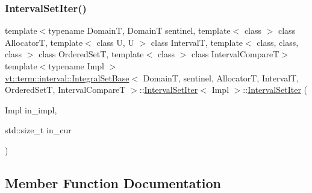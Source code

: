 \subsubsection{\texorpdfstring{Interval\+Set\+Iter()}{IntervalSetIter()}}
{\footnotesize\ttfamily template$<$typename DomainT, DomainT sentinel, template$<$ class $>$ class AllocatorT, template$<$ class U, U $>$ class IntervalT, template$<$ class, class, class $>$ class Ordered\+SetT, template$<$ class $>$ class Interval\+CompareT$>$ \\
template$<$typename Impl $>$ \\
\hyperlink{structvt_1_1term_1_1interval_1_1_integral_set_base}{vt\+::term\+::interval\+::\+Integral\+Set\+Base}$<$ DomainT, sentinel, AllocatorT, IntervalT, Ordered\+SetT, Interval\+CompareT $>$\+::\hyperlink{structvt_1_1term_1_1interval_1_1_integral_set_base_1_1_interval_set_iter}{Interval\+Set\+Iter}$<$ Impl $>$\+::\hyperlink{structvt_1_1term_1_1interval_1_1_integral_set_base_1_1_interval_set_iter}{Interval\+Set\+Iter} (\begin{DoxyParamCaption}\item[{Impl}]{in\+\_\+impl,  }\item[{std\+::size\+\_\+t}]{in\+\_\+cur }\end{DoxyParamCaption})\hspace{0.3cm}{\ttfamily [inline]}}



\subsection{Member Function Documentation}
\mbox{\label{structvt_1_1term_1_1interval_1_1_integral_set_base_1_1_interval_set_iter_ae229788677a1abe98372f54204a3dbe7}} 
